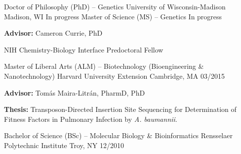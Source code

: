 

\begin{cventries}
\cventry
	{Doctor of Philosophy (PhD) -- Genetics}
	{University of Wisconsin-Madison}
	{Madison, WI}
	{In progress}
	{}
	\vspace{-0.4cm}
\cventry
	{Master of Science (MS) -- Genetics}
	{}
	{}
	{In progress}
	{
      \begin{cvitems}
      	\item {\textbf{Advisor:} Cameron Currie, PhD}
      	\item {NIH Chemistry-Biology Interface Predoctoral Fellow}
      \end{cvitems}
    }
    
\cventry
	{Master of Liberal Arts (ALM) -- Biotechnology (Bioengineering \& Nanotechnology)}
	{Harvard University Extension}
	{Cambridge, MA}
	{03/2015}
	{
      \begin{cvitems}
      	\item {\textbf{Advisor:} Tom\'{a}s Maira-Litr\'{a}n, PharmD, PhD}
      	\item {\textbf{Thesis:} Transposon-Directed Insertion Site Sequencing for Determination of Fitness Factors in Pulmonary Infection by \textit{A. baumannii}.}
      \end{cvitems}
    }

\cventry
	{Bachelor of Science (BSc) -- Molecular Biology \& Bioinformatics}
	{Rensselaer Polytechnic Institute}
	{Troy, NY}
	{12/2010}
	{}
\end{cventries}